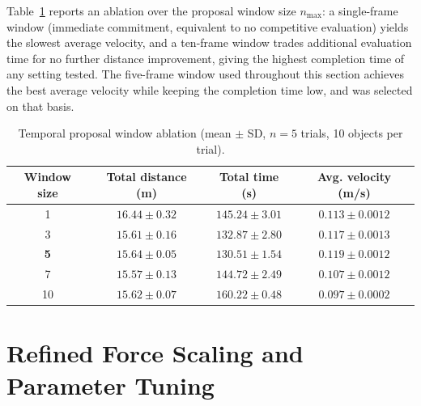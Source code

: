 Table~\ref{tab:cta_windowablation} reports an ablation over the proposal window size $n_{\max}$: a
single-frame window (immediate commitment, equivalent to no competitive evaluation) yields the
slowest average velocity, and a ten-frame window trades additional evaluation time for no further
distance improvement, giving the highest completion time of any setting tested. The five-frame
window used throughout this section achieves the best average velocity while keeping the completion
time low, and was selected on that basis.

\begin{table}[htbp]
\centering
\caption{Temporal proposal window ablation (mean $\pm$ SD, $n=5$ trials, 10 objects per trial).}
\label{tab:cta_windowablation}
\begin{tabular}{cccc}
\toprule
\textbf{Window size} & \textbf{Total distance (m)} & \textbf{Total time (s)} & \textbf{Avg. velocity (m/s)} \\
\midrule
1              & $16.44 \pm 0.32$ & $145.24 \pm 3.01$ & $0.113 \pm 0.0012$ \\
3              & $15.61 \pm 0.16$ & $132.87 \pm 2.80$ & $0.117 \pm 0.0013$ \\
\textbf{5}     & $\mathbf{15.64 \pm 0.05}$ & $\mathbf{130.51 \pm 1.54}$ & $\mathbf{0.119 \pm 0.0012}$ \\
7              & $15.57 \pm 0.13$ & $144.72 \pm 2.49$ & $0.107 \pm 0.0012$ \\
10             & $15.62 \pm 0.07$ & $160.22 \pm 0.48$ & $0.097 \pm 0.0002$ \\
\bottomrule
\end{tabular}
\end{table}

\section{Refined Force Scaling and Parameter Tuning}\label{sec:cta_tuning}

